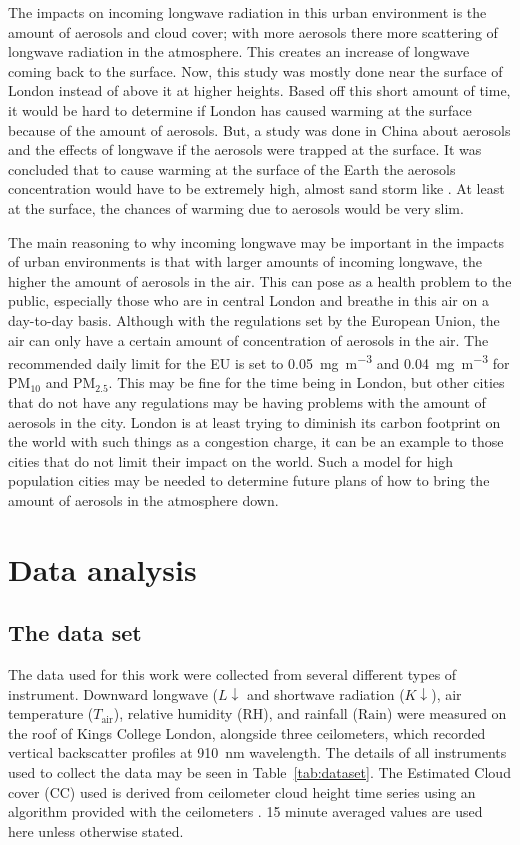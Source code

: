 \documentclass[a4paper,titlepage, twoside]{report}
\newcommand\Kdown{K\!\!\downarrow}
\newcommand\Ldown{L\!\!\downarrow}
\begin{document}
The impacts on incoming longwave radiation in this urban environment is the amount of aerosols and cloud cover; with more aerosols there more scattering of longwave radiation in the atmosphere.  This creates an increase of longwave coming back to the surface.  Now, this study was mostly done near the surface of London instead of above it at higher heights.  Based off this short amount of time, it would be hard to determine if London has caused warming at the surface because of the amount of aerosols.  But, a study was done in China about aerosols and the effects of longwave if the aerosols were trapped at the surface.  It was concluded that to cause warming at the surface of the Earth the aerosols concentration would have to be extremely high, almost sand storm like \parencite{zhou}.  At least at the surface, the chances of warming due to aerosols would be very slim.

The main reasoning to why incoming longwave may be important in the impacts of urban environments is that with larger amounts of incoming longwave, the higher the amount of aerosols in the air.  This can pose as a health problem to the public, especially those who are in central London and breathe in this air on a day-to-day basis.  Although with the regulations set by the European Union, the air can only have a certain amount of concentration of aerosols in the air.  The recommended daily limit for the EU is set to \SI{0.05}{\milli\gram\per\meter\cubed} and \SI{0.04}{\milli\gram\per\meter\cubed} for $\mathrm{PM_{10}}$ and $\mathrm{PM_{2.5}}$.  This may be fine for the time being in London, but other cities that do not have any regulations may be having problems with the amount of aerosols in the city.  London is at least trying to diminish its carbon footprint on the world with such things as a congestion charge, it can be an example to those cities that do not limit their impact on the world.  Such a model for high population cities may be needed to determine future plans of how to bring the amount of aerosols in the atmosphere down.

\chapter{Data analysis}
\section{The data set}
The data used for this work were collected from several different types of instrument. Downward longwave ($\Ldown$ and shortwave radiation ($\Kdown$), air temperature ($T_\mathrm{air}$), relative humidity ($\mathrm{RH}$), and rainfall ($\mathrm{Rain}$) were measured on the roof of Kings College London, alongside three ceilometers, which recorded vertical backscatter profiles at \SI{910}{\nano\meter} wavelength.  The details of all instruments used to collect the data may be seen in Table~\ref{tab:dataset}.  The Estimated Cloud cover ($\mathrm{CC}$) used is derived from ceilometer cloud height time series using an algorithm provided with the ceilometers \parencite{vaisala2}.  15 minute averaged values are used here unless otherwise stated.
\end{document}
